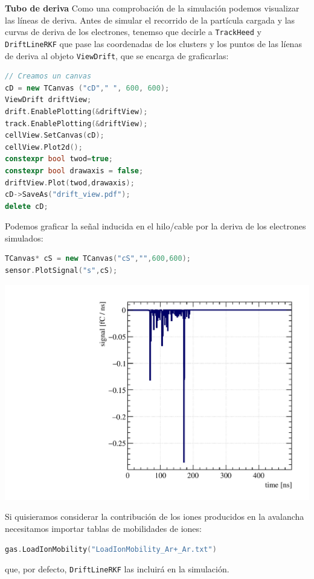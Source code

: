 \begin{Ejemplo}{\textbf{Tubo de deriva}}
Como una comprobación de la simulación podemos visualizar las líneas de deriva. Antes de simular el recorrido de la partícula cargada y las curvas de deriva de los electrones, tenemso que decirle a \texttt{TrackHeed} y \texttt{DriftLineRKF} que pase las coordenadas de los clusters y los puntos de las líenas de deriva al objeto \texttt{ViewDrift}, que se encarga de graficarlas:  \\

\begin{lstlisting}[language=C++,style=c++]
// Creamos un canvas
cD = new TCanvas ("cD"," ", 600, 600);
ViewDrift driftView;
drift.EnablePlotting(&driftView);
track.EnablePlotting(&driftView);
cellView.SetCanvas(cD);
cellView.Plot2d();
constexpr bool twod=true;
constexpr bool drawaxis = false;
driftView.Plot(twod,drawaxis);
cD->SaveAs("drift_view.pdf");
delete cD;
\end{lstlisting} 
\vspace*{1em}
Podemos graficar la señal inducida en el hilo/cable por la deriva de los electrones simulados:  \\

\begin{lstlisting}[language=C++,style=c++]
TCanvas* cS = new TCanvas("cS","",600,600);
sensor.PlotSignal("s",cS);
\end{lstlisting} 
\vspace*{1em}

\begin{center}
    \includegraphics[width=0.4\linewidth]{Chapters/EjemploGarfield/TuboDeriva/build/signal.pdf}
\end{center}

Si quisieramos considerar la contribución de los iones producidos en la avalancha necesitamos importar tablas de mobilidades de iones: \\


\begin{lstlisting}[language=C++,style=c++]
gas.LoadIonMobility("LoadIonMobility_Ar+_Ar.txt")
\end{lstlisting} 
\vspace*{1em}

que, por defecto, \texttt{DriftLineRKF} las incluirá en la simulación. 






\end{Ejemplo}
